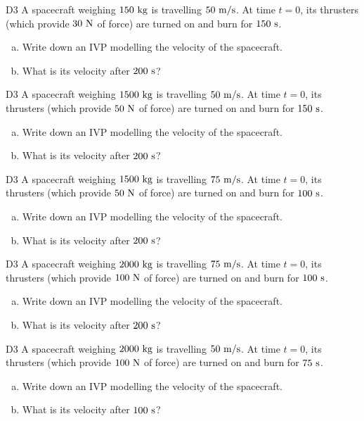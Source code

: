 \begin{problem}{D3}
A spacecraft weighing \(150\ {\rm kg}\) is travelling \(50\ {\rm m/s}\).  At time \(t=0\), its thrusters (which provide \(30\ {\rm N}\) of force) are turned on and burn for \(150\ {\rm s}\).  
\begin{enumerate}[(a)]
\item Write down an IVP modelling the velocity of the spacecraft.
\item What is its velocity after \(200\ {\rm s}\)?
\end{enumerate}
\end{problem}

\begin{problem}{D3}
A spacecraft weighing \(1500\ {\rm kg}\) is travelling \(50\ {\rm m/s}\).  At time \(t=0\), its thrusters (which provide \(50\ {\rm N}\) of force) are turned on and burn for \(150\ {\rm s}\).  
\begin{enumerate}[(a)]
\item Write down an IVP modelling the velocity of the spacecraft.
\item What is its velocity after \(200\ {\rm s}\)?
\end{enumerate}
\end{problem}

\begin{problem}{D3}
A spacecraft weighing \(1500\ {\rm kg}\) is travelling \(75\ {\rm m/s}\).  At time \(t=0\), its thrusters (which provide \(50\ {\rm N}\) of force) are turned on and burn for \(100\ {\rm s}\).  
\begin{enumerate}[(a)]
\item Write down an IVP modelling the velocity of the spacecraft.
\item What is its velocity after \(200\ {\rm s}\)?
\end{enumerate}
\end{problem}

\begin{problem}{D3}
A spacecraft weighing \(2000\ {\rm kg}\) is travelling \(75\ {\rm m/s}\).  At time \(t=0\), its thrusters (which provide \(100\ {\rm N}\) of force) are turned on and burn for \(100\ {\rm s}\).  
\begin{enumerate}[(a)]
\item Write down an IVP modelling the velocity of the spacecraft.
\item What is its velocity after \(200\ {\rm s}\)?
\end{enumerate}
\end{problem}

\begin{problem}{D3}
A spacecraft weighing \(2000\ {\rm kg}\) is travelling \(50\ {\rm m/s}\).  At time \(t=0\), its thrusters (which provide \(100\ {\rm N}\) of force) are turned on and burn for \(75\ {\rm s}\).  
\begin{enumerate}[(a)]
\item Write down an IVP modelling the velocity of the spacecraft.
\item What is its velocity after \(100\ {\rm s}\)?
\end{enumerate}
\end{problem}
